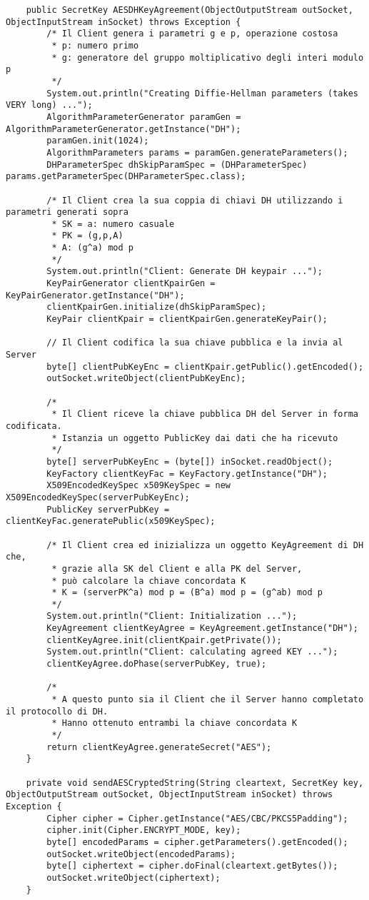 \documentclass[12pt]{article}
\begin{document}
\begin{lstlisting}
	public SecretKey AESDHKeyAgreement(ObjectOutputStream outSocket, ObjectInputStream inSocket) throws Exception {
		/* Il Client genera i parametri g e p, operazione costosa
		 * p: numero primo
		 * g: generatore del gruppo moltiplicativo degli interi modulo p
		 */
		System.out.println("Creating Diffie-Hellman parameters (takes VERY long) ...");
		AlgorithmParameterGenerator paramGen = AlgorithmParameterGenerator.getInstance("DH");
		paramGen.init(1024);
		AlgorithmParameters params = paramGen.generateParameters();
		DHParameterSpec dhSkipParamSpec = (DHParameterSpec) params.getParameterSpec(DHParameterSpec.class);

		/* Il Client crea la sua coppia di chiavi DH utilizzando i parametri generati sopra
		 * SK = a: numero casuale
		 * PK = (g,p,A)
		 * A: (g^a) mod p
		 */
		System.out.println("Client: Generate DH keypair ...");
		KeyPairGenerator clientKpairGen = KeyPairGenerator.getInstance("DH");
		clientKpairGen.initialize(dhSkipParamSpec);
		KeyPair clientKpair = clientKpairGen.generateKeyPair();

		// Il Client codifica la sua chiave pubblica e la invia al Server
		byte[] clientPubKeyEnc = clientKpair.getPublic().getEncoded();
		outSocket.writeObject(clientPubKeyEnc);

		/*
		 * Il Client riceve la chiave pubblica DH del Server in forma codificata.
		 * Istanzia un oggetto PublicKey dai dati che ha ricevuto
		 */
		byte[] serverPubKeyEnc = (byte[]) inSocket.readObject();
		KeyFactory clientKeyFac = KeyFactory.getInstance("DH");
		X509EncodedKeySpec x509KeySpec = new X509EncodedKeySpec(serverPubKeyEnc);
		PublicKey serverPubKey = clientKeyFac.generatePublic(x509KeySpec);

		/* Il Client crea ed inizializza un oggetto KeyAgreement di DH che,
		 * grazie alla SK del Client e alla PK del Server,
		 * può calcolare la chiave concordata K
		 * K = (serverPK^a) mod p = (B^a) mod p = (g^ab) mod p
		 */
		System.out.println("Client: Initialization ...");
		KeyAgreement clientKeyAgree = KeyAgreement.getInstance("DH");
		clientKeyAgree.init(clientKpair.getPrivate());
		System.out.println("Client: calculating agreed KEY ...");
		clientKeyAgree.doPhase(serverPubKey, true);

		/*
		 * A questo punto sia il Client che il Server hanno completato il protocollo di DH.
		 * Hanno ottenuto entrambi la chiave concordata K
		 */
		return clientKeyAgree.generateSecret("AES");
	}

	private void sendAESCryptedString(String cleartext, SecretKey key, ObjectOutputStream outSocket, ObjectInputStream inSocket) throws Exception {
		Cipher cipher = Cipher.getInstance("AES/CBC/PKCS5Padding");
		cipher.init(Cipher.ENCRYPT_MODE, key);
		byte[] encodedParams = cipher.getParameters().getEncoded();
		outSocket.writeObject(encodedParams);
		byte[] ciphertext = cipher.doFinal(cleartext.getBytes());
		outSocket.writeObject(ciphertext);
	}


\end{lstlisting}
\end{document}
